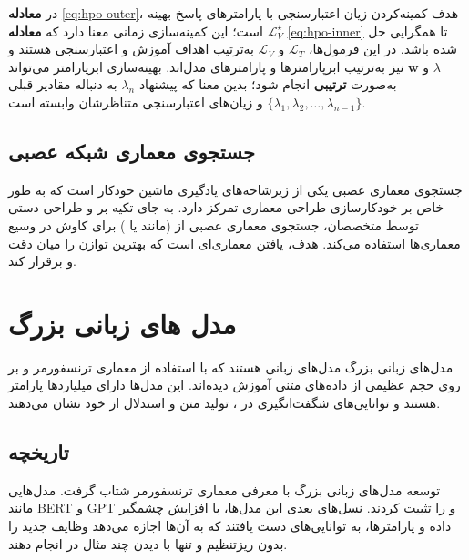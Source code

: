 در \textbf{معادله} \eqref{eq:hpo-outer}، هدف کمینه‌کردن زیان اعتبارسنجی با پارامترهای پاسخ بهینه $\mathcal{L}_V^\star$ است؛ این کمینه‌سازی زمانی معنا دارد که \textbf{معادله} \eqref{eq:hpo-inner} تا همگرایی حل شده باشد. در این فرمول‌ها، $\mathcal{L}_T$ و $\mathcal{L}_V$ به‌ترتیب اهداف آموزش و اعتبارسنجی هستند و $\lambda$ و $\mathbf{w}$ نیز به‌ترتیب ابرپارامترها و پارامترهای مدل‌اند. بهینه‌سازی ابرپارامتر می‌تواند به‌صورت \textbf{ترتیبی} انجام شود؛ بدین معنا که پیشنهاد $\lambda_n$ به دنباله مقادیر قبلی $\{\lambda_1,\lambda_2,\ldots,\lambda_{n-1}\}$ و زیان‌های اعتبارسنجی متناظرشان وابسته است.

\subsection{جستجوی معماری شبکه عصبی}
جستجوی معماری عصبی یکی از زیرشاخه‌های یادگیری ماشین خودکار است که به طور خاص بر خودکارسازی طراحی معماری  تمرکز دارد. به جای تکیه بر  و طراحی دستی توسط متخصصان، جستجوی معماری عصبی از  (مانند  یا ) برای کاوش در  وسیع معماری‌ها استفاده می‌کند. هدف، یافتن معماری‌ای است که بهترین توازن را میان دقت و  برقرار کند.

\section{مدل های زبانی بزرگ}
مدل‌های زبانی بزرگ مدل‌های زبانی هستند که با استفاده از معماری ترنسفورمر و بر روی حجم عظیمی از داده‌های متنی آموزش دیده‌اند. این مدل‌ها دارای میلیاردها پارامتر هستند و توانایی‌های شگفت‌انگیزی در ، تولید متن  و استدلال از خود نشان می‌دهند.

\subsection{تاریخچه}
توسعه مدل‌های زبانی بزرگ با معرفی معماری ترنسفورمر \cite{vaswani2017attention} شتاب گرفت. مدل‌هایی مانند BERT \cite{devlin2019bert} و GPT \cite{brown2020language}   و  را تثبیت کردند. نسل‌های بعدی این مدل‌ها، با افزایش چشمگیر  داده و پارامترها، به توانایی‌های  دست یافتند که به آن‌ها اجازه می‌دهد وظایف جدید را بدون ریزتنظیم و تنها با دیدن چند مثال در  انجام دهند.

